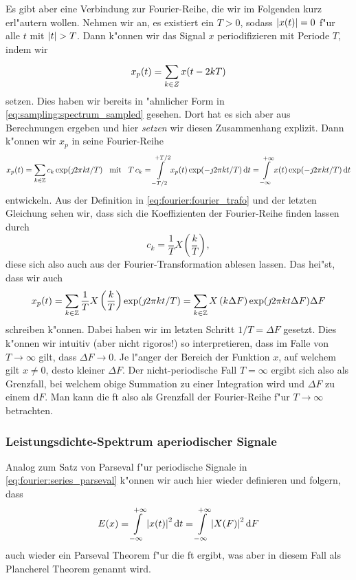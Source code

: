 Es gibt aber eine Verbindung zur Fourier-Reihe, die wir im Folgenden kurz erl"autern wollen.
Nehmen wir an, es existiert ein $T > 0$, sodass ${\left| x(t) \right|} = 0$ f"ur alle $t$ mit ${\left| t \right|} > T$.
Dann k"onnen wir das Signal $x$ periodifizieren mit Periode $T$, indem wir
\[
x_p(t) = {\sum\limits_{k \in Z}^{}{x(t - 2kT)}}
\]
setzen.
Dies haben wir bereits in "ahnlicher Form in \eqref{eq:sampling:spectrum_sampled} gesehen. 
Dort hat es sich aber aus Berechnungen ergeben und hier \emph{setzen} wir diesen Zusammenhang explizit.
Dann k"onnen wir $x_p$ in seine Fourier-Reihe 
\[
x_p(t) = {\sum\limits_{k \in \mathbb{Z}}^{}{c_k \exp(\jmath 2 \pi k t/T)}}
{\hspace{3mm} \text{mit} \hspace{3mm}}
T\,c_k = {\int\limits_{-T/2}^{+T/2}{x_p(t) \exp(- \jmath 2 \pi k t/T)}\,\mathrm{d}{t}}
    = {\int\limits_{-\infty}^{+\infty}{x(t) \exp(- \jmath 2 \pi k t/T)}\,\mathrm{d}{t}}
\]
entwickeln.
Aus der Definition in \eqref{eq:fourier:fourier_trafo} und der letzten Gleichung sehen wir, dass sich die Koeffizienten der Fourier-Reihe finden lassen durch
\begin{equation}\label{eq:fourier:c_k_fourier}
    c_k = \frac 1T X\left(\frac kT\right),
\end{equation}
diese sich also auch aus der Fourier-Transformation ablesen lassen.
Das hei"st, dass wir auch
\[
x_p(t) = {\sum\limits_{k \in \mathbb{Z}}^{}{\frac 1T X\left(\frac kT\right) \exp(\jmath 2 \pi k t/T)}}
       = {\sum\limits_{k \in \mathbb{Z}}^{}{X\left(k \Delta F\right) \exp(\jmath 2 \pi k t \Delta F) \Delta F}}
\]
schreiben k"onnen.
Dabei haben wir im letzten Schritt $1/T = \Delta F$ gesetzt.
Dies k"onnen wir intuitiv (aber nicht rigoros!) so interpretieren, dass im Falle von $T \rightarrow \infty$ gilt, dass $\Delta F \rightarrow 0$.
Je l"anger der Bereich der Funktion $x$, auf welchem gilt $x \neq 0$, desto kleiner $\Delta F$.
Der nicht-periodische Fall $T = \infty$ ergibt sich also als Grenzfall, bei welchem obige Summation zu einer Integration wird und $\Delta F$ zu einem $\mathrm{d}F$.
Man kann die \acrlong{ft} also als Grenzfall der Fourier-Reihe f"ur $T \rightarrow \infty$ betrachten.
%
%
\subsubsection{Leistungsdichte-Spektrum aperiodischer Signale}
%
Analog zum Satz von Parseval f"ur periodische Signale in \eqref{eq:fourier:series_parseval} k"onnen wir auch hier wieder definieren und folgern, dass
\begin{equation}
E(x) = {\int\limits_{-\infty}^{+\infty}{{\left| x(t) \right|}^2}\,\mathrm{d}{t}}
     = {\int\limits_{-\infty}^{+\infty}{{\left| X(F) \right|}^2}\,\mathrm{d}{F}}
\end{equation}
auch wieder ein Parseval Theorem f"ur die \acrlong{ft} ergibt, was aber in diesem Fall als Plancherel Theorem genannt wird.

